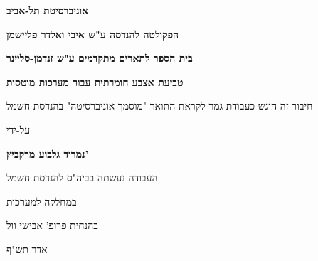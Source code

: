 \begin{otherlanguage}{hebrew}
\begin{center}
\begin{davidfont}
  \vspace*{1cm}
  
  \large
  \textbf{אוניברסיטת תל-אביב}
  
  \footnotesize
  \textbf{הפקולטה להנדסה ע"ש איבי ואלדר פליישמן}
   
  \textbf{בית הספר לתארים מתקדמים ע"ש זנדמן-סליינר}
   
  \vspace{1.2cm}
  \LARGE
  \textbf{טביעת אצבע חומרתית עבור מערכות מוטסות}
  
  \vspace{0.5cm}
   
  \vspace{1cm}
  \normalsize
  חיבור זה הוגש כעבודת גמר לקראת התואר "מוסמך אוניברסיטה" בהנדסת חשמל
   
  \vspace{0.5cm}
  על-ידי
   
  \Large
  \textbf{נמרוד גלבוע מרקביץ'}
   
  \vspace{1 cm}
  \normalsize
  העבודה נעשתה בביה"ס להנדסת חשמל
  
  במחלקה למערכות
   
  \vspace{0.5cm}
  
  בהנחית פרופ' אבישי וול
   
  \vspace{0.5cm}
  \large
  אדר תש"ף
\end{davidfont}
\end{center}
\end{otherlanguage}
